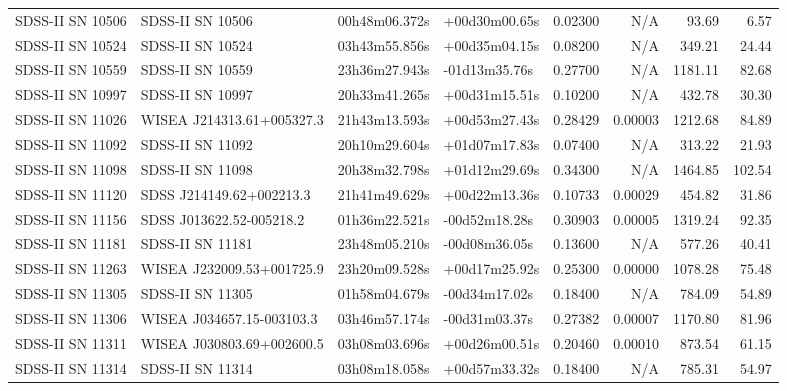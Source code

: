 \begin{longtable}{llllrrrr}
SDSS-II SN 10506 &                SDSS-II SN 10506 &   00h48m06.372s &   +00d30m00.65s &  0.02300 &      N/A &    93.69 &        6.57 \\
SDSS-II SN 10524 &                SDSS-II SN 10524 &   03h43m55.856s &   +00d35m04.15s &  0.08200 &      N/A &   349.21 &       24.44 \\
SDSS-II SN 10559 &                SDSS-II SN 10559 &   23h36m27.943s &   -01d13m35.76s &  0.27700 &      N/A &  1181.11 &       82.68 \\
SDSS-II SN 10997 &                SDSS-II SN 10997 &   20h33m41.265s &   +00d31m15.51s &  0.10200 &      N/A &   432.78 &       30.30 \\
SDSS-II SN 11026 &       WISEA J214313.61+005327.3 &   21h43m13.593s &   +00d53m27.43s &  0.28429 &  0.00003 &  1212.68 &       84.89 \\
SDSS-II SN 11092 &                SDSS-II SN 11092 &   20h10m29.604s &   +01d07m17.83s &  0.07400 &      N/A &   313.22 &       21.93 \\
SDSS-II SN 11098 &                SDSS-II SN 11098 &   20h38m32.798s &   +01d12m29.69s &  0.34300 &      N/A &  1464.85 &      102.54 \\
SDSS-II SN 11120 &        SDSS J214149.62+002213.3 &   21h41m49.629s &   +00d22m13.36s &  0.10733 &  0.00029 &   454.82 &       31.86 \\
SDSS-II SN 11156 &        SDSS J013622.52-005218.2 &   01h36m22.521s &   -00d52m18.28s &  0.30903 &  0.00005 &  1319.24 &       92.35 \\
SDSS-II SN 11181 &                SDSS-II SN 11181 &   23h48m05.210s &   -00d08m36.05s &  0.13600 &      N/A &   577.26 &       40.41 \\
SDSS-II SN 11263 &       WISEA J232009.53+001725.9 &   23h20m09.528s &   +00d17m25.92s &  0.25300 &  0.00000 &  1078.28 &       75.48 \\
SDSS-II SN 11305 &                SDSS-II SN 11305 &   01h58m04.679s &   -00d34m17.02s &  0.18400 &      N/A &   784.09 &       54.89 \\
SDSS-II SN 11306 &       WISEA J034657.15-003103.3 &   03h46m57.174s &   -00d31m03.37s &  0.27382 &  0.00007 &  1170.80 &       81.96 \\
SDSS-II SN 11311 &       WISEA J030803.69+002600.5 &   03h08m03.696s &   +00d26m00.51s &  0.20460 &  0.00010 &   873.54 &       61.15 \\
SDSS-II SN 11314 &                SDSS-II SN 11314 &   03h08m18.058s &   +00d57m33.32s &  0.18400 &      N/A &   785.31 &       54.97 \\

\end{longtable}
